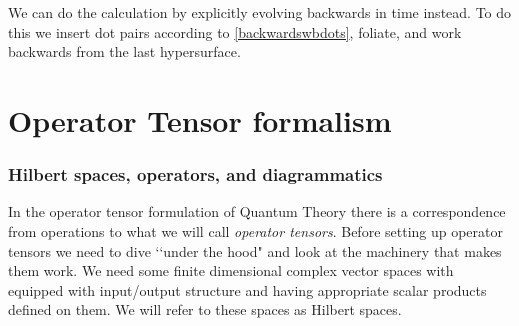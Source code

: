 \documentclass[10pt]{article}
\begin{document}
We can do the calculation by explicitly evolving backwards in time instead. To do this we insert dot pairs according to \eqref{backwardswbdots}, foliate, and work backwards from the last hypersurface.



\part{Operator Tensor formalism}\label{part:operatortensorformalism}




\section{Hilbert spaces, operators, and diagrammatics}\label{sec:hilbertspacesoperatorsanddiagrammatics}

In the operator tensor formulation of Quantum Theory there is a correspondence from operations to what we will call \emph{operator tensors}.  Before setting up operator tensors we need to dive \lq\lq under the hood" and look at the machinery that makes them work.  We need some finite dimensional complex vector spaces with equipped with input/output structure and having appropriate scalar products defined on them.  We will refer to these spaces as Hilbert spaces.
\end{document}
